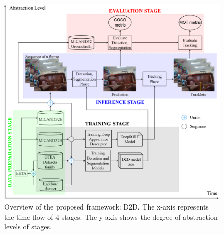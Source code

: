\begin{figure}[htbp]
	\centerline{\includegraphics[width=1\linewidth]{Figs/proposedFramework.png}}
	\caption{Overview of the proposed framework: D2D. The x-axis represents the time flow of 4 stages. The y-axis shows the degree of abstraction levels of stages.}
	\label{fig:framework}
\end{figure}
